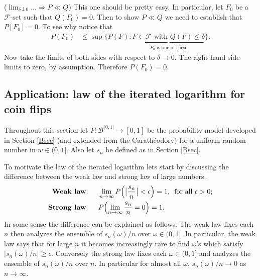 \begin{exerciseproof}
({\sl $ \lim_{\delta\downarrow 0}\ldots \Longrightarrow P\ll Q$}) This one should be pretty easy. In particular,  let $F_0$ be a $ \mathcal F$-set such that $Q(F_0)=0$. Then to show $P\ll Q$ we need to establish that $P[F_0]=0$. To see why notice that
\begin{align*}
P(F_0)
&\leq  \sup\{ P(F)\colon \underbrace{\text{$F\in \mathcal F$ with $Q(F)\leq \delta$}}_{\text{$F_0$ is one of these}} \}.
\end{align*}
Now take the limits of both sides with respect to $\delta\rightarrow 0$. The right hand side limits to zero, by assumption. Therefore $P(F_0) = 0 $.
\end{exerciseproof}





\subsection{Application: law of the iterated logarithm for coin flips}


\begin{sectionassumption}
Throughout this section let $P:\mathcal B^{(0,1]}\rightarrow [0,1]$ be the probability model developed in Section \ref{Bsec} (and extended from the Carath\'eodory) for a uniform random number in $w\in (0,1]$. Also let $s_n$ be defined as in Section \ref{Bsec}.
\end{sectionassumption}


To motivate the law of the iterated logarithm lets start by discussing the difference between the weak law and strong law of large numbers.
\begin{align*}
\text{{\bf Weak law}:   } &\quad \lim_{n\rightarrow \infty} P\Bigl(\bigl|\frac{s_n}{n}\bigr| < \epsilon \Bigr) = 1, \,\text{ for all $\epsilon>0$;}\\
\text{{\bf Strong law}:   } &\quad  P\Bigl(\lim_{n\rightarrow \infty} \frac{s_n}{n} = 0 \Bigr) = 1.
\end{align*}
In some sense the difference can be explained as follows. The weak law fixes each $n$ then analyzes the ensemble of $s_n(\omega)/n$
over $\omega\in (0,1]$. In particular, the weak law says that for large $n$ it becomes increasingly rare to find $\omega$'s which satisfy $|s_n(\omega)/n| \geq \epsilon$.  Conversely the strong law fixes each $\omega\in (0,1]$ and analyzes the ensemble of $s_n(\omega)/n$  over $n$. In particular for almost all $\omega$,  $s_n(\omega)/n\rightarrow 0$ as $n\rightarrow \infty$.

